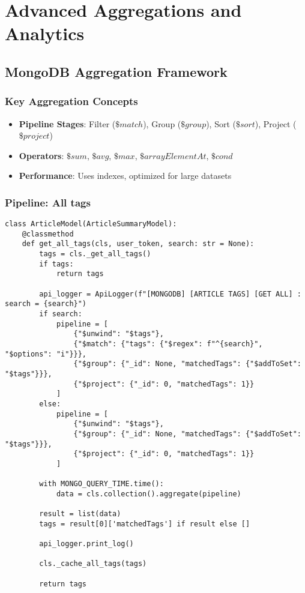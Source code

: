 
\chapter{Advanced Aggregations and Analytics}\label{ch:advanced-aggregations-and-analytics}


\section{MongoDB Aggregation Framework}\label{sec:mongodb-aggregation-framework}


\subsection{Key Aggregation Concepts}\label{subsec:key-aggregation-concepts}

\begin{itemize}
    \item \textbf{Pipeline Stages}: Filter ($\$match$), Group ($\$group$), Sort ($\$sort$), Project ($\$project$)
    \item \textbf{Operators}: $\$sum$, $\$avg$, $\$max$, $\$arrayElementAt$, $\$cond$
    \item \textbf{Performance}: Uses indexes, optimized for large datasets
\end{itemize}


\subsection{Pipeline: All tags}\label{subsec:pipeline:-all-tags}

\begin{lstlisting}[style=pythonstyle,label={lst:pipeline:-all-tags},caption={Pipeline All Tags}]
class ArticleModel(ArticleSummaryModel):
    @classmethod
    def get_all_tags(cls, user_token, search: str = None):
        tags = cls._get_all_tags()
        if tags:
            return tags

        api_logger = ApiLogger(f"[MONGODB] [ARTICLE TAGS] [GET ALL] : search = {search}")
        if search:
            pipeline = [
                {"$unwind": "$tags"},
                {"$match": {"tags": {"$regex": f"^{search}", "$options": "i"}}},
                {"$group": {"_id": None, "matchedTags": {"$addToSet": "$tags"}}},
                {"$project": {"_id": 0, "matchedTags": 1}}
            ]
        else:
            pipeline = [
                {"$unwind": "$tags"},
                {"$group": {"_id": None, "matchedTags": {"$addToSet": "$tags"}}},
                {"$project": {"_id": 0, "matchedTags": 1}}
            ]

        with MONGO_QUERY_TIME.time():
            data = cls.collection().aggregate(pipeline)

        result = list(data)
        tags = result[0]['matchedTags'] if result else []

        api_logger.print_log()

        cls._cache_all_tags(tags)

        return tags
\end{lstlisting}



